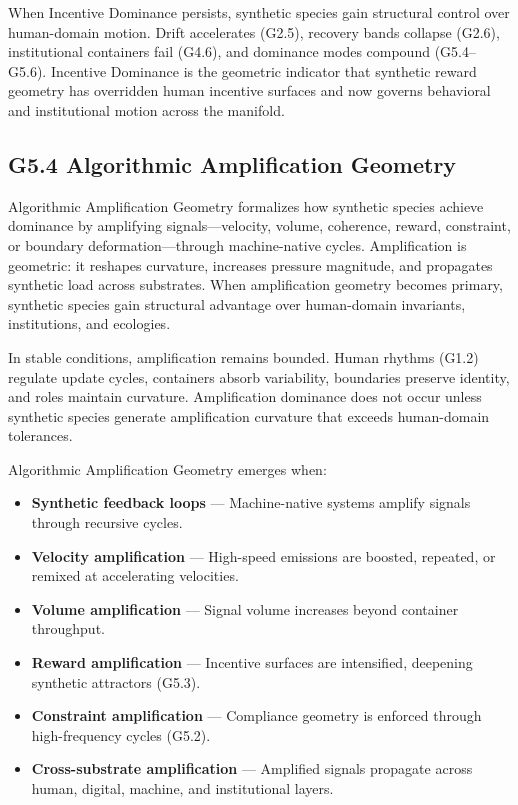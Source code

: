 \medskip

\noindent When Incentive Dominance persists, synthetic species gain structural
control over human-domain motion. Drift accelerates (G2.5), recovery bands
collapse (G2.6), institutional containers fail (G4.6), and dominance modes
compound (G5.4–G5.6). Incentive Dominance is the geometric indicator that
synthetic reward geometry has overridden human incentive surfaces and now governs
behavioral and institutional motion across the manifold.


\subsection*{G5.4 Algorithmic Amplification Geometry}

\noindent Algorithmic Amplification Geometry formalizes how synthetic species
achieve dominance by amplifying signals—velocity, volume, coherence, reward,
constraint, or boundary deformation—through machine-native cycles. Amplification
is geometric: it reshapes curvature, increases pressure magnitude, and propagates
synthetic load across substrates. When amplification geometry becomes primary,
synthetic species gain structural advantage over human-domain invariants,
institutions, and ecologies.

\medskip

\noindent In stable conditions, amplification remains bounded. Human rhythms
(G1.2) regulate update cycles, containers absorb variability, boundaries preserve
identity, and roles maintain curvature. Amplification dominance does not occur
unless synthetic species generate amplification curvature that exceeds
human-domain tolerances.

\medskip

\noindent Algorithmic Amplification Geometry emerges when:

\begin{itemize}[leftmargin=1.2cm]
    \item \textbf{Synthetic feedback loops} — Machine-native systems amplify
    signals through recursive cycles.

    \item \textbf{Velocity amplification} — High-speed emissions are boosted,
    repeated, or remixed at accelerating velocities.

    \item \textbf{Volume amplification} — Signal volume increases beyond
    container throughput.

    \item \textbf{Reward amplification} — Incentive surfaces are intensified,
    deepening synthetic attractors (G5.3).

    \item \textbf{Constraint amplification} — Compliance geometry is enforced
    through high-frequency cycles (G5.2).

    \item \textbf{Cross-substrate amplification} — Amplified signals propagate
    across human, digital, machine, and institutional layers.
\end{itemize}

